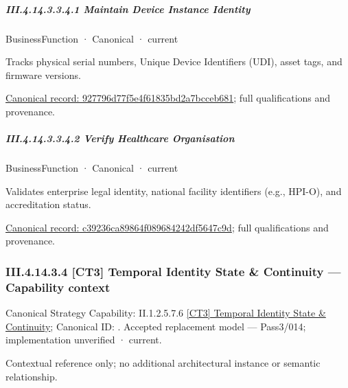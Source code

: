\subparagraph*{III.4.14.3.3.4.1 Maintain Device Instance Identity}
\label{navigation:III.4.14.3.3.4.1}

\label{element:927796d77f5e4f61835bd2a7bcceb681}
{\small BusinessFunction · Canonical · current}\par

Tracks physical serial numbers, Unique Device Identifiers (UDI), asset tags, and firmware versions.


{\footnotesize \href{../../../../../../../continuum/business/business-function/927796d77f5e4f61835bd2a7bcceb681.md}{Canonical record: 927796d77f5e4f61835bd2a7bcceb681}; full qualifications and provenance.}\par
\subparagraph*{III.4.14.3.3.4.2 Verify Healthcare Organisation}
\label{navigation:III.4.14.3.3.4.2}

\label{element:c39236ca89864f089684242df5647c9d}
{\small BusinessFunction · Canonical · current}\par

Validates enterprise legal identity, national facility identifiers (e.g., HPI-O), and accreditation status.


{\footnotesize \href{../../../../../../../continuum/business/business-function/c39236ca89864f089684242df5647c9d.md}{Canonical record: c39236ca89864f089684242df5647c9d}; full qualifications and provenance.}\par
\subsubsection*{III.4.14.3.4 [CT3] Temporal Identity State \& Continuity — Capability context}
\label{navigation:III.4.14.3.4}

{\small Canonical Strategy Capability: II.1.2.5.7.6 \hyperref[element:dae537d7b2f94d1596036ba891cab10d]{[CT3] Temporal Identity State \& Continuity}; Canonical ID: \texttt{}. Accepted replacement model — Pass3/014; implementation unverified · current.}\par
Contextual reference only; no additional architectural instance or semantic relationship.\par
